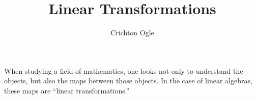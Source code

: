 \documentclass{ximera}
\title{Linear Transformations}
\author{Crichton Ogle}
\begin{document}
\begin{abstract}
\end{abstract}
\maketitle

When studying a field of mathematics, one looks not only to understand
the objects, but also the maps between those objects.  In the case of
linear algebras, these maps are ``linear transformations.''
\end{document}
